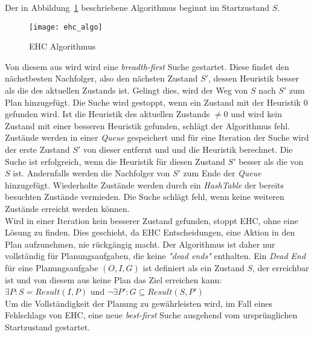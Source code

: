 Der in Abbildung~\ref{fig:ehc_algo} beschriebene Algorithmus beginnt im Startzustand $S$.
\begin{figure}[h!]
           \centering
           \texttt{[image: ehc\_algo]}
           \caption{\acl{EHC} Algorithmus~\cite{hoffmannnebel2001}}
           \label{fig:ehc_algo}
\end{figure}
Von diesem aus wird wird eine \emph{breadth-first} Suche gestartet.
Diese findet den nächstbesten Nachfolger, also den nächsten Zustand $S'$, dessen Heuristik besser als die des aktuellen Zustands ist.
Gelingt dies, wird der Weg von $S$ nach $S'$ zum Plan hinzugefügt.
Die Suche wird gestoppt, wenn ein Zustand mit der Heuristik 0 gefunden wird.
Ist die Heuristik des aktuellen Zustands $\neq 0$ und wird kein Zustand mit einer besseren Heuristik gefunden, schlägt der Algorithmus fehl.
Zustände werden in einer \emph{Queue} gespeichert und für eine Iteration der Suche wird der erste Zustand $S'$ von dieser entfernt und und die Heuristik berechnet.
Die Suche ist erfolgreich, wenn die Heuristik für diesen Zustand $S'$ besser als die von $S$ ist.
Andernfalls werden die Nachfolger von $S'$ zum Ende der \emph{Queue} hinzugefügt.
Wiederholte Zustände werden durch ein \emph{HashTable} der bereits besuchten Zustände vermieden.
Die Suche schlägt fehl, wenn keine weiteren Zustände erreicht werden können.\\
Wird in einer Iteration kein besserer Zustand gefunden, stoppt \ac{EHC}, ohne eine Lösung zu finden.
Dies geschieht, da \ac{EHC} Entscheidungen, eine Aktion in den Plan aufzunehmen, nie rückgängig macht.
Der Algorithmus ist daher nur vollständig für Planungsaufgaben, die keine \emph{"dead ends"} enthalten.
Ein \emph{Dead End} für eine Planungsaufgabe $(O,I,G)$ ist definiert als ein Zustand $S$, der erreichbar ist und von diesem aus keine Plan das Ziel erreichen kann:\\
$\exists P: S = Result(I,P)$  und  $\neg\exists P': G\subseteq Result(S,P')$\\
Um die Vollständigkeit der Planung zu gewährleisten wird, im Fall eines Fehlschlags von \ac{EHC}, eine neue \emph{best-first} Suche ausgehend vom ursprünglichen Startzustand gestartet.
